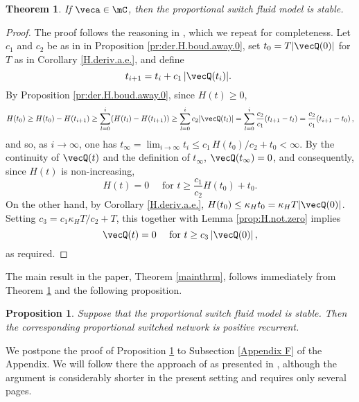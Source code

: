\documentclass{amsart}
\newtheorem{theorem}{Theorem}
\newtheorem{proposition}{Proposition}
\begin{document}
\begin{theorem} \label{FluidStable}
If $\veca \in \mC$, then the proportional switch fluid model is stable.
\end{theorem}
\begin{proof}
The proof follows the reasoning in \cite{Br96a}, which we repeat for completeness.
Let $c_1$ and $c_2$ be as in in Proposition \ref{pr:der.H.boud.away.0}, set $t_0=T|\vecQ(0)|$ for $T$ as in Corollary \ref{H.deriv.a.e.}, and define
\begin{equation}\label{eq:t_i.rec}
t_{i+1} = t_i + c_1 \, |\vecQ(t_i)|. \ 
\end{equation}
By Proposition \ref{pr:der.H.boud.away.0}, since $H(t)\ge 0$, 
$$
H(t_0) \geq
H(t_0) - H(t_{i+1}) \geq
\sum_{l=0}^i (H(t_l) - H(t_{l+1})) \geq \sum_{l=0}^i c_2 |\vecQ(t_l)| 
= \sum_{l=0}^i \frac{c_2}{c_1} (t_{l+1}-t_l) 
= \frac{c_2}{c_1} (t_{i+1} -t_{0})\,,
$$
and so, as $i \to \infty$, one has
$t_\infty =\lim_{i\rightarrow\infty} t_i \leq c_1 \, H(t_0)/c_2 + t_0 < \infty$.
By the continuity of $\vecQ(t)$  and the definition of $t_{\infty}$, 
$\vecQ(t_\infty)=0$, and consequently, since $H(t)$ is non-increasing,
\begin{equation*}
H(t)=0 \quad \mbox{ for } t\geq \frac{c_1}{c_2}  H(t_0) + t_0.
\end{equation*}
On the other hand, by Corollary \ref{H.deriv.a.e.}, $H(t_0)\leq \kappa_H t_0= \kappa_H T |\vecQ(0)|$.
Setting $c_3=c_1 \kappa_H T/c_2+T$, this together with Lemma \ref{prop:H.not.zero} implies 
\begin{equation}\label{eq:Q.hitting.time.of.zero}
\vecQ(t)=0 \quad \mbox{ for } t\geq c_3 \, |\vecQ(0)|\,,
\end{equation}
as required.
\end{proof}

The main result in the paper, Theorem \ref{mainthrm}, follows immediately from Theorem  \ref{FluidStable} and the following proposition.
\begin{proposition}
\label{propFMQN}
Suppose that the proportional switch fluid model is stable.  Then the corresponding proportional switched network is positive recurrent.
\end{proposition} 

We postpone the proof of Proposition \ref{propFMQN} to Subsection \ref{Appendix F} of the Appendix.  We  will follow there the approach of \cite{Da95} as presented in \cite{Br08}, although the argument is considerably shorter in the present setting and requires only several pages. 
\end{document}
